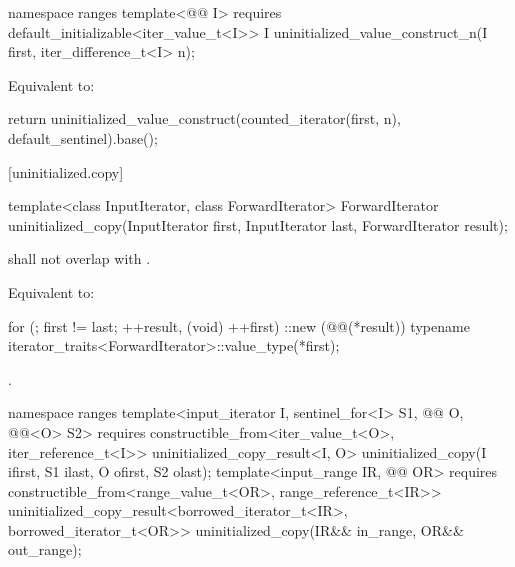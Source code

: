 %
\begin{itemdecl}
namespace ranges {
  template<@@ I>
      requires default_initializable<iter_value_t<I>>
    I uninitialized_value_construct_n(I first, iter_difference_t<I> n);
}
\end{itemdecl}

\begin{itemdescr}
\pnum
\effects
Equivalent to:
\begin{codeblock}
return uninitialized_value_construct(counted_iterator(first, n),
                                     default_sentinel).base();
\end{codeblock}
\end{itemdescr}

[uninitialized.copy]{}

%
\begin{itemdecl}
template<class InputIterator, class ForwardIterator>
  ForwardIterator uninitialized_copy(InputIterator first, InputIterator last,
                                     ForwardIterator result);
\end{itemdecl}

\begin{itemdescr}
\pnum
\expects
{} shall not overlap with .

\pnum
\effects
Equivalent to:
\begin{codeblock}
for (; first != last; ++result, (void) ++first)
  ::new (@@(*result))
    typename iterator_traits<ForwardIterator>::value_type(*first);
\end{codeblock}

\pnum
\returns
{}.
\end{itemdescr}

%
\begin{itemdecl}
namespace ranges {
  template<input_iterator I, sentinel_for<I> S1,
           @@ O, @@<O> S2>
      requires constructible_from<iter_value_t<O>, iter_reference_t<I>>
    uninitialized_copy_result<I, O>
      uninitialized_copy(I ifirst, S1 ilast, O ofirst, S2 olast);
  template<input_range IR, @@ OR>
      requires constructible_from<range_value_t<OR>, range_reference_t<IR>>
    uninitialized_copy_result<borrowed_iterator_t<IR>, borrowed_iterator_t<OR>>
      uninitialized_copy(IR&& in_range, OR&& out_range);
}
\end{itemdecl}

